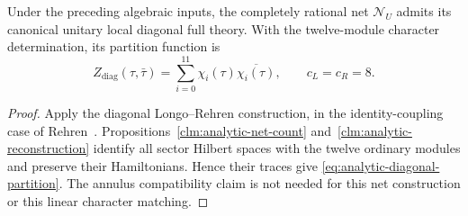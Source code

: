 \begin{proposition}
\label{prop:analytic-diagonal}
Under the preceding algebraic inputs, the completely rational net
$\mathcal N_U$ admits its canonical unitary local diagonal full theory.
With the twelve-module character determination, its partition function is
\begin{equation}
 Z_{\mathrm{diag}}(\tau,\bar\tau)
   =\sum_{i=0}^{11}\chi_i(\tau)\overline{\chi_i(\tau)},
 \qquad c_L=c_R=8.
 \label{eq:analytic-diagonal-partition}
\end{equation}
\end{proposition}
\begin{proof}
Apply the diagonal Longo--Rehren construction, in the identity-coupling
case of
Rehren~\cite[Theorem~1.4, Proposition~1.5, and Corollary~1.6]{Rehren}.
Propositions~\ref{clm:analytic-net-count} and~\ref{clm:analytic-reconstruction}
identify all sector Hilbert spaces with the twelve ordinary
modules and preserve their Hamiltonians.  Hence their traces give
\eqref{eq:analytic-diagonal-partition}.  The annulus compatibility claim
is not needed for this net construction or this linear character matching.
\end{proof}

